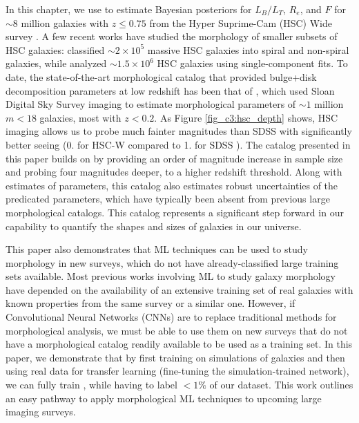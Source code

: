In this chapter, we use \gampen{} to estimate Bayesian posteriors for $L_B/L_T$, $R_e$, and $F$ for $\sim 8$ million galaxies with $z \leq 0.75$ from the Hyper Suprime-Cam (HSC) Wide survey \citep{hsc_design}. A few recent works have studied the morphology of smaller subsets of HSC galaxies: \citet{shimakawa_2021} classified $\sim2\times10^5$ massive HSC galaxies into spiral and non-spiral galaxies, while \citet{hsc_sersic} analyzed $\sim1.5\times10^6$ HSC galaxies using single-component \sersic{} fits. To date, the state-of-the-art morphological catalog that provided bulge+disk decomposition parameters at low redshift has been that of \citet{simard_11}, which used Sloan Digital Sky Survey \citep[SDSS; ][]{sdss_tech_summary} imaging to estimate morphological parameters of $\sim1$ million $m < 18$ galaxies, most with $z < 0.2$. As Figure \ref{fig_c3:hsc_depth} shows, HSC imaging allows us to probe much fainter magnitudes than SDSS with significantly better seeing (0. for HSC-W \gb{} compared to 1. for SDSS \gb{}). The catalog presented in this paper builds on \citet{simard_11} by providing an order of magnitude increase in sample size and probing four magnitudes deeper, to a higher redshift threshold. Along with estimates of parameters, this catalog also estimates robust uncertainties of the predicated parameters, which have typically been absent from previous large morphological catalogs. This catalog represents a significant step forward in our capability to quantify the shapes and sizes of galaxies in our universe. 


This paper also demonstrates that ML techniques can be used to study morphology in new surveys, which do not have already-classified large training sets available. Most previous works involving ML to study galaxy morphology have depended on the availability of an extensive training set of real galaxies with known properties from the same survey or a similar one. However, if Convolutional Neural Networks (CNNs) are to replace traditional methods for morphological analysis, we must be able to use them on new surveys that do not have a morphological catalog readily available to be used as a training set. In this paper, we demonstrate that by first training on simulations of galaxies and then using real data for transfer learning (fine-tuning the simulation-trained network), we can fully train \gampen{}, while having to label $<1\%$ of our dataset. This work outlines an easy pathway to apply morphological ML techniques to upcoming large imaging surveys.  


